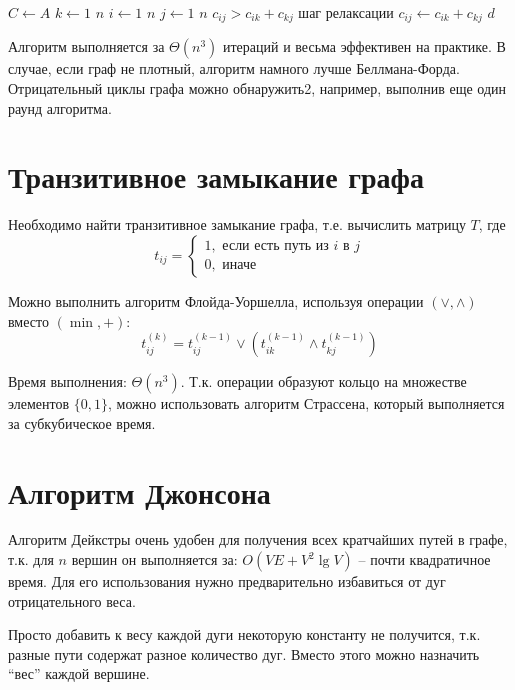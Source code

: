 \documentclass[11pt]{article}
\begin{document}
\begin{codebox}
\li $C \gets A$
\li \For $k \gets 1$ \To $n$
\li \Do \For $i \gets 1$ \To $n$
\li        \Do \For $j \gets 1$ \To $n$
\li            \Do \If $c_{i j} > c_{i k} + c_{k j}$ \Comment шаг релаксации
\li                \Then $c_{i j} \gets c_{i k} + c_{k j}$
               \End
            \End
        \End
    \End
\li \Return $d$
\end{codebox}

Алгоритм выполняется за $\Theta(n^3)$ итераций и весьма эффективен на практике. В случае, если граф не плотный, алгоритм намного лучше Беллмана-Форда. Отрицательный циклы графа можно обнаружить2, например, выполнив еще один раунд алгоритма.
\section{Транзитивное замыкание графа}
Необходимо найти транзитивное замыкание графа, т.е. вычислить матрицу $T$, где
\begin{equation*}
  t_{i j} = \begin{cases}
    1, \text{ если есть путь из } i \text{ в } j \\
    0, \text{ иначе}
  \end{cases}
\end{equation*}

Можно выполнить алгоритм Флойда-Уоршелла, используя операции $(\vee, \wedge)$ вместо $(\min, +)$:
\begin{equation*}
  t_{i j}^{(k)} = t_{i j}^{(k-1)} \vee (t_{i k}^{(k-1)} \wedge t_{k j}^{(k-1)})
\end{equation*}

Время выполнения: $\Theta(n^3)$. Т.к. операции образуют кольцо на множестве элементов $\{0, 1\}$, можно использовать алгоритм Страссена, который выполняется за субкубическое время.
\section{Алгоритм Джонсона}
Алгоритм Дейкстры очень удобен для получения всех кратчайших путей в графе, т.к. для $n$ вершин он выполняется за: $O(VE + V^2 \lg V)$ -- почти квадратичное время. Для его использования нужно предварительно избавиться от дуг отрицательного веса.

Просто добавить к весу каждой дуги некоторую константу не получится, т.к. разные пути содержат разное количество дуг. Вместо этого можно назначить ``вес'' каждой вершине.
\end{document}
